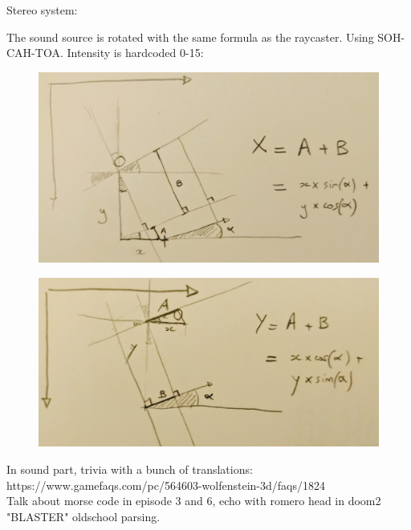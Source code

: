 \par
Stereo system:\\
\par
The sound source is rotated with the same formula as the raycaster. Using SOH-CAH-TOA. Intensity is hardcoded 0-15:\\
\par
\begin{figure}[H]
\centering
 \includegraphics[width=\textwidth]{imgs/drawings/audio_y_rotate.png}
 \end{figure}
 \par
 \begin{figure}[H]
\centering
 \includegraphics[width=\textwidth]{imgs/drawings/audio_x_rotate.png}
 \end{figure}
\par
In sound part, trivia with a bunch of translations: https://www.gamefaqs.com/pc/564603-wolfenstein-3d/faqs/1824\\
Talk about morse code in episode 3 and 6, echo with romero head in doom2\\
"BLASTER" oldschool parsing.








